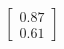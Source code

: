 \documentclass[preview]{standalone}
\begin{document}
\begin{align*}
\begin{bmatrix} 0.87 \\ 0.61 \end{bmatrix}
\end{align*}
\end{document}
